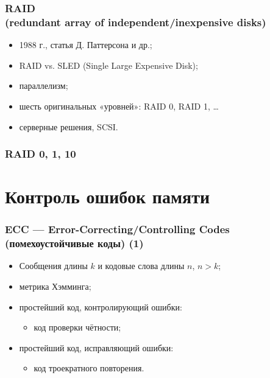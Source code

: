 \begin{frame}
\frametitle{RAID\\(redundant array of independent/inexpensive disks)}
\begin{itemize}[<+->]
    \item 1988 г., статья Д. Паттерсона и др.;
    \item RAID vs. SLED (Single Large Expensive Disk);
    \item параллелизм;
    \item шесть оригинальных «уровней»: RAID 0, RAID 1, …
    \item серверные решения, SCSI.
\end{itemize}
\end{frame}

\begin{frame}
\frametitle{RAID 0, 1, 10}
\end{frame}

\section {Контроль ошибок памяти}


\begin{frame}
\frametitle{ECC — Error-Correcting/Controlling Codes (помехоустойчивые коды) (1)}

\begin{itemize}%
    \item Сообщения длины $k$ и кодовые слова длины $n$, $n > k$;

    \item метрика Хэмминга;

    \item простейший код, контролирующий ошибки:
    \begin{itemize}
        \item код проверки чётности;
    \end{itemize}

    \item простейший код, исправляющий ошибки:
    \begin{itemize}
        \item код троекратного повторения.
    \end{itemize}
\end{itemize}
\end{frame}

